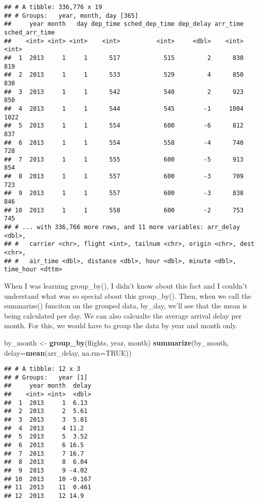 \documentclass[
]{article}
\newenvironment{Shaded}{\begin{snugshade}}{\end{snugshade}}
\newcommand{\DataTypeTok}[1]{\textcolor[rgb]{0.13,0.29,0.53}{#1}}
\newcommand{\KeywordTok}[1]{\textcolor[rgb]{0.13,0.29,0.53}{\textbf{#1}}}
\newcommand{\NormalTok}[1]{#1}
\newcommand{\OtherTok}[1]{\textcolor[rgb]{0.56,0.35,0.01}{#1}}
\newcommand{\StringTok}[1]{\textcolor[rgb]{0.31,0.60,0.02}{#1}}
\begin{document}
\begin{verbatim}
## # A tibble: 336,776 x 19
## # Groups:   year, month, day [365]
##     year month   day dep_time sched_dep_time dep_delay arr_time sched_arr_time
##    <int> <int> <int>    <int>          <int>     <dbl>    <int>          <int>
##  1  2013     1     1      517            515         2      830            819
##  2  2013     1     1      533            529         4      850            830
##  3  2013     1     1      542            540         2      923            850
##  4  2013     1     1      544            545        -1     1004           1022
##  5  2013     1     1      554            600        -6      812            837
##  6  2013     1     1      554            558        -4      740            728
##  7  2013     1     1      555            600        -5      913            854
##  8  2013     1     1      557            600        -3      709            723
##  9  2013     1     1      557            600        -3      838            846
## 10  2013     1     1      558            600        -2      753            745
## # ... with 336,766 more rows, and 11 more variables: arr_delay <dbl>,
## #   carrier <chr>, flight <int>, tailnum <chr>, origin <chr>, dest <chr>,
## #   air_time <dbl>, distance <dbl>, hour <dbl>, minute <dbl>, time_hour <dttm>
\end{verbatim}

When I was learning group\_by(), I didn't know about this fact and I
couldn't understand what was so special about this group\_by(). Then,
when we call the summarize() funciton on the grouped data, by\_day,
we'll see that the mean is being calculated per day. We can also
calcualte the average arrival delay per month. For this, we would have
to group the data by year and month only.

\begin{Shaded}
\begin{Highlighting}[]
\NormalTok{by_month <-}\StringTok{ }\KeywordTok{group_by}\NormalTok{(flights, year, month)}
\KeywordTok{summarize}\NormalTok{(by_month, }\DataTypeTok{delay=}\KeywordTok{mean}\NormalTok{(arr_delay, }\DataTypeTok{na.rm=}\OtherTok{TRUE}\NormalTok{))}
\end{Highlighting}
\end{Shaded}

\begin{verbatim}
## # A tibble: 12 x 3
## # Groups:   year [1]
##     year month  delay
##    <int> <int>  <dbl>
##  1  2013     1  6.13 
##  2  2013     2  5.61 
##  3  2013     3  5.81 
##  4  2013     4 11.2  
##  5  2013     5  3.52 
##  6  2013     6 16.5  
##  7  2013     7 16.7  
##  8  2013     8  6.04 
##  9  2013     9 -4.02 
## 10  2013    10 -0.167
## 11  2013    11  0.461
## 12  2013    12 14.9
\end{verbatim}
\end{document}
